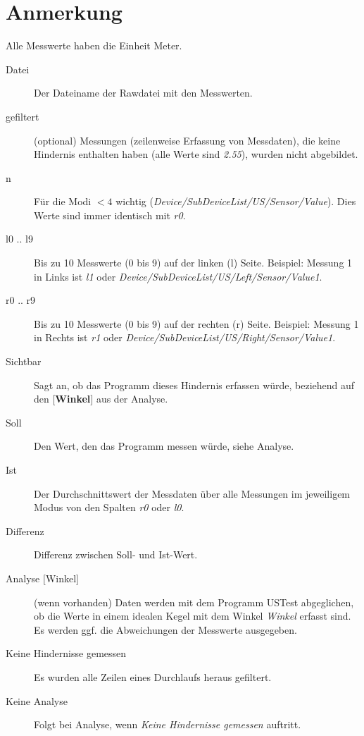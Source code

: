 \documentclass[a4paper,11pt, titlepage]{scrartcl}
\begin{document}
\section*{Anmerkung}   
Alle Messwerte haben die Einheit Meter.
\begin{description}
    \item[Datei] Der Dateiname der Rawdatei mit den Messwerten.
    \item[gefiltert] (optional) Messungen (zeilenweise Erfassung von Messdaten), die keine Hindernis enthalten haben (alle Werte sind \textit{2.55}), wurden nicht abgebildet.
    \item[n] Für die Modi $< 4$ wichtig (\textit{Device/SubDeviceList/US/Sensor/Value}). Dies Werte sind immer identisch mit \textit{r0}.
    \item[l0 .. l9] Bis zu 10 Messwerte (0 bis 9) auf der linken (l) Seite. Beispiel: Messung 1 in Links ist \textit{l1} oder \textit{Device/SubDeviceList/US/Left/Sensor/Value1}.
    \item[r0 .. r9] Bis zu 10 Messwerte (0 bis 9) auf der rechten (r) Seite. Beispiel: Messung 1 in Rechts ist \textit{r1} oder \textit{Device/SubDeviceList/US/Right/Sensor/Value1}.
    \item[Sichtbar] Sagt an, ob das Programm dieses Hindernis erfassen würde, beziehend auf den $[$\textbf{Winkel}$]$ aus der Analyse.
    \item[Soll] Den Wert, den das Programm messen würde, siehe Analyse.
    \item[\diameter{}Ist] Der Durchschnittswert der Messdaten über alle Messungen im jeweiligem Modus von den Spalten \textit{r0} oder \textit{l0}.
    \item[Differenz] Differenz zwischen Soll- und Ist-Wert.
    \item[Analyse {$[$Winkel$]$}] (wenn vorhanden) Daten werden mit dem Programm USTest abgeglichen, ob die Werte in einem idealen Kegel mit dem Winkel \textit{Winkel} erfasst sind. Es werden ggf. die Abweichungen der Messwerte ausgegeben. 
    \item[Keine Hindernisse gemessen] Es wurden alle Zeilen eines Durchlaufs heraus gefiltert.
    \item[Keine Analyse] Folgt bei Analyse, wenn \textit{Keine Hindernisse gemessen} auftritt.

\end{description}
\end{document}
